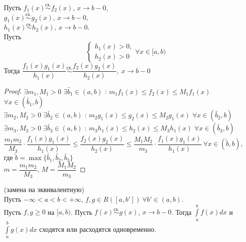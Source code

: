 \begin{lemma}
    Пусть $f_1(x) \overset{\text{сх.}}{\sim} f_2(x)$, $x \to b - 0,$ \\
    $g_1(x) \overset{\text{сх.}}{\sim} g_2(x)$, $x \to b - 0,$ \\
    $h_1(x) \overset{\text{сх.}}{\sim} h_2(x)$, $x \to b - 0$. \\
    Пусть \begin{equation*}
            \begin{cases}
                h_1(x) > 0, \\
                h_2(x) > 0
            \end{cases}
            \forall x \in [a, b)
           \end{equation*}
    Тогда $\dfrac{f_1(x) g_1(x)}{h_1(x)} \overset{\text{сх.}}{\sim} \dfrac{f_2(x) g_2(x)}{h_2(x)}, \ x \to b - 0$
\end{lemma}

\begin{proof}
    $\exists m_1, M_1 > 0$ $\exists \widetilde{b_1} \in (a, b)$ :
    $m_1 f_1(x) \leq f_2(x) \leq M_1 f_1(x)$ $\forall x \in (\widetilde{b_1}, b)$ \\
    $\exists m_2, M_2 > 0$ $\exists \widetilde{b_2} \in (a, b)$ :
    $m_2 g_1(x) \leq g_2(x) \leq M_2 g_1(x)$ $\forall x \in (\widetilde{b_2}, b)$ \\
    $\exists m_3, M_3 > 0$ $\exists \widetilde{b_3} \in (a, b)$ :
    $m_3 h_1(x) \leq h_2(x) \leq M_3 h_1(x)$ $\forall x \in (\widetilde{b_3}, b)$ \\
    $\dfrac{m_1 m_2}{M_3} \cdot \dfrac{f_1(x) g_1(x)}{h_1(x)} \leq \dfrac{f_2(x) g_2(x)}{h_2(x)} \leq \dfrac{M_1 M_2}{m_3} \cdot \dfrac{f_1(x) g_1(x)}{h_1(x)} \ \forall x \in (\widetilde{b}, b)$, где $\widetilde{b} = \max\{\widetilde{b_1}, \widetilde{b_2}, \widetilde{b_3}\}$ \\
    $m = \dfrac{m_1 m_2}{M_3}$, $M = \dfrac{M_1 M_2}{m_3}$
\end{proof}

\begin{theorem} (замена на эквивалентную) \\
    Пусть $-\infty < a < b < +\infty$, $f, g \in R([a, b']) \ \forall b' \in (a, b).$ \\
    Пусть $f, g \geq 0$ на $[a, b)$.
    Пусть $f(x) \overset{\text{сх.}}{\sim} g(x)$, $x \to b - 0$.
    Тогда $\int \limits_a^b f(x) dx$ и $\int \limits_a^b g(x) dx $ сходятся или расходятся одновременно.
\end{theorem}

